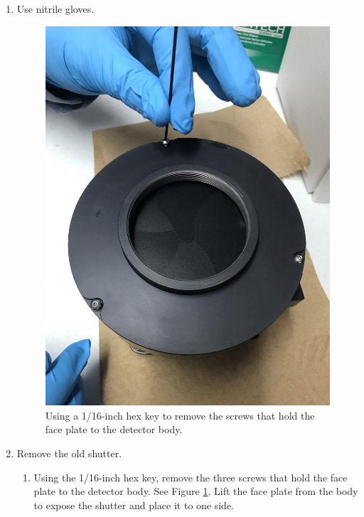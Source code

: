\begin{enumerate}
\item 
Use nitrile gloves.

\begin{figure}
\begin{center}
\includegraphics[width=0.8\linewidth]{figures/instrument-ddoti-detector-face-plate-screws}
\end{center}
\caption{Using a 1/16-inch hex key to remove the screws that hold the face plate to the detector body.}
\label{figure:instrument-ddoti-detector-face-plate-screws}
\end{figure}

\item Remove the old shutter.
\begin{enumerate}

\item Using the 1/16-inch hex key, remove the three screws that hold the face plate to the detector body. See Figure \ref{figure:instrument-ddoti-detector-face-plate-screws}. Lift the face plate from the body to expose the shutter and place it to one side.


\end{enumerate}
\end{enumerate}
